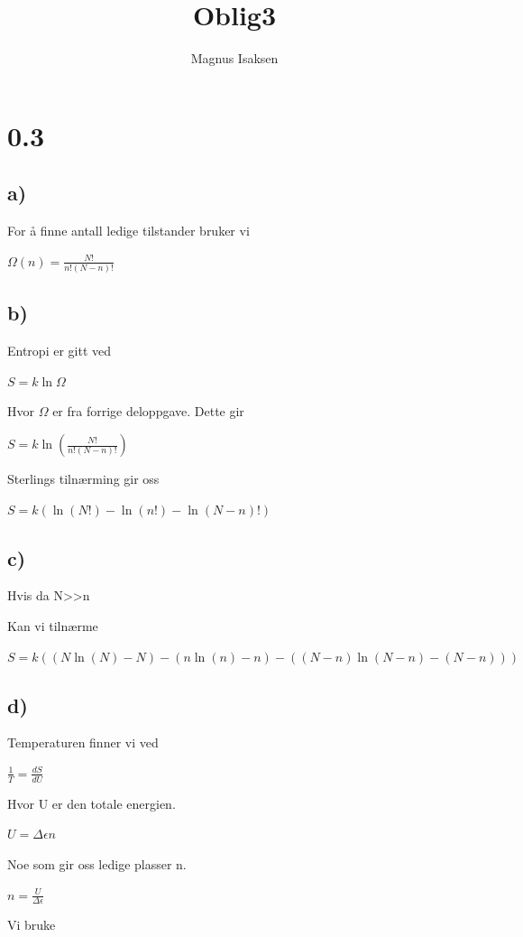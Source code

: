 \documentclass[12pt]{article}
\begin{document}
\title{Oblig3}
\author{Magnus Isaksen}
\maketitle

\section*{0.3}

\subsection*{a)}

For å finne antall ledige tilstander bruker vi 

$\Omega(n) = \frac{N!}{n!(N-n)!} $

\subsection*{b)}

Entropi er gitt ved 

$S = k\ln \Omega$

Hvor $\Omega$ er fra forrige deloppgave. Dette gir

$S = k\ln (\frac{N!}{n!(N-n)!})$

Sterlings tilnærming gir oss 

$S = k(\ln(N!) -\ln(n!) -\ln(N-n)!)$

\subsection*{c)}
Hvis da N>>n 

Kan vi tilnærme 

$ S = k((N\ln(N) -N) - (n\ln(n) -n) - ((N-n)\ln(N-n) -(N-n)))$



\subsection*{d)}

Temperaturen finner vi ved 

$\frac{1}{T} = \frac{dS}{dU}$

Hvor U er den totale energien.

$U = \Delta \epsilon n$

Noe som gir oss ledige plasser n. 

$n = \frac{U}{\Delta \epsilon}$

Vi bruke
\end{document}
